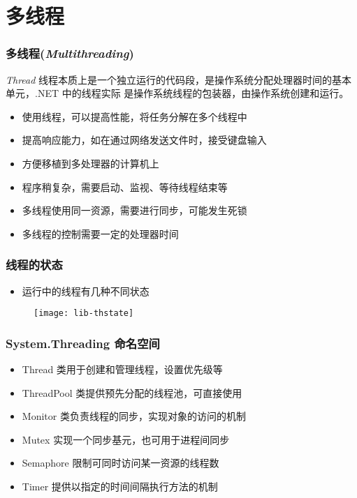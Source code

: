 
\section{多线程}


\begin{frame}
\frametitle{多线程(\textit{Multithreading})}
\begin{block}{\textit{Thread}}
  \CJKindent 线程本质上是一个独立运行的代码段，是操作系统分配处理器时间的基本单元，.NET 中的线程实际
  是操作系统线程的包装器，由操作系统创建和运行。
\end{block}
\begin{itemize}
\item 使用线程，可以提高性能，将任务分解在多个线程中
\item 提高响应能力，如在通过网络发送文件时，接受键盘输入
\item 方便移植到多处理器的计算机上
\end{itemize}
\medskip
\begin{itemize}
\item 程序稍复杂，需要启动、监视、等待线程结束等
\item 多线程使用同一资源，需要进行同步，可能发生死锁
\item 多线程的控制需要一定的处理器时间
\end{itemize}
\end{frame}

\begin{frame}
\frametitle{线程的状态}
\begin{itemize}
\item 运行中的线程有几种不同状态
\end{itemize}
\begin{figure}
  \centering
  \texttt{[image: lib-thstate]}
\end{figure}
\end{frame}

\begin{frame}
\frametitle{System.Threading 命名空间}
\begin{itemize}
\setlength{\itemsep}{6pt plus 1pt}
\item Thread 类用于创建和管理线程，设置优先级等
\item ThreadPool 类提供预先分配的线程池，可直接使用
\item Monitor 类负责线程的同步，实现对象的访问的机制
\item Mutex 实现一个同步基元，也可用于进程间同步
\item Semaphore 限制可同时访问某一资源的线程数
\item Timer 提供以指定的时间间隔执行方法的机制
\end{itemize}
\end{frame}

